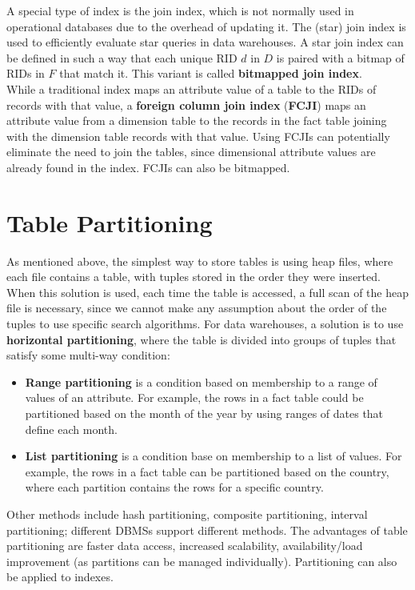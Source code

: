 A special type of index is the join index, which is not normally used in operational databases due to the overhead of updating it. The (star) join index is used to efficiently evaluate star queries in data warehouses.
A star join index can be defined in such a way that each unique RID $d$ in $D$ is paired with a bitmap of RIDs in $F$ that match it. This variant is called \textbf{bitmapped join index}. \\
While a traditional index maps an attribute value of a table to the RIDs of records with that value, a \textbf{foreign column join index} (\textbf{FCJI}) maps an attribute value from a dimension table to the records in the fact table joining with the dimension table records with that value. Using FCJIs can potentially eliminate the need to join the tables, since dimensional attribute values are already found in the index. FCJIs can also be bitmapped.

\section{Table Partitioning}

As mentioned above, the simplest way to store tables is using heap files, where each file contains a table, with tuples stored in the order they were inserted. When this solution is used, each time the table is accessed, a full scan of the heap file is necessary, since we cannot make any assumption about the order of the tuples to use specific search algorithms. For data warehouses, a solution is to use \textbf{horizontal partitioning}, where the table is divided into groups of tuples that satisfy some multi-way condition:
\begin{itemize}
    \item \textbf{Range partitioning} is a condition based on membership to a range of values of an attribute. For example, the rows in a fact table could be partitioned based on the month of the year by using ranges of dates that define each month.
    \item \textbf{List partitioning} is a condition base on membership to a list of values. For example, the rows in a fact table can be partitioned based on the country, where each partition contains the rows for a specific country.
\end{itemize}
Other methods include hash partitioning, composite partitioning, interval partitioning; different DBMSs support different methods. The advantages of table partitioning are faster data access, increased scalability, availability/load improvement (as partitions can be managed individually). Partitioning can also be applied to indexes.

